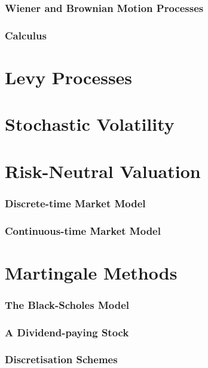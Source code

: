 \documentclass[12pt, a4paper]{article}
\begin{document}
\section{Wiener and Brownian Motion Processes}


\section{\Ito{} Calculus}
%

\part{Levy Processes}
%


\part{Stochastic Volatility}
%

\part{Risk-Neutral Valuation}

\section{Discrete-time Market Model}
%

\section{Continuous-time Market Model}
%

\part{Martingale Methods}
\section{The Black-Scholes Model}


\section{A Dividend-paying Stock}
%

\section{Discretisation Schemes}
%
\end{document}

